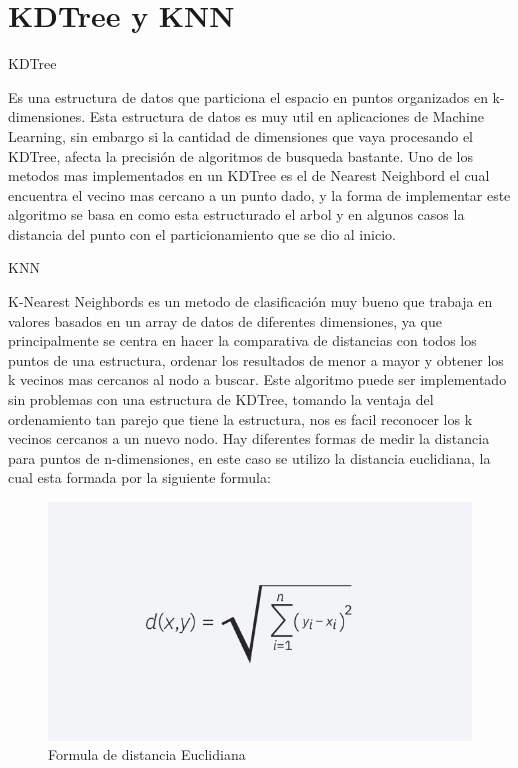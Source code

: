 \documentclass[12pt]{article} %
\begin{document}
\section{KDTree y KNN}
\vspace{10mm}

KDTree
\vspace{10mm}

Es una estructura de datos que particiona el espacio en puntos organizados en k-dimensiones. Esta estructura de datos es muy util en aplicaciones de Machine Learning,
sin embargo si la cantidad de dimensiones que vaya procesando el KDTree, afecta la precisión de algoritmos de busqueda bastante. Uno de los metodos mas implementados en un KDTree
es el de Nearest Neighbord el cual encuentra el vecino mas cercano a un punto dado, y la forma de implementar este algoritmo se basa en como esta estructurado el arbol 
y en algunos casos la distancia del punto con el particionamiento que se dio al inicio.
\vspace{10mm}

KNN
\vspace{10mm}

K-Nearest Neighbords es un metodo de clasificación muy bueno que trabaja en valores basados en un array de datos de diferentes dimensiones, ya que principalmente se centra en 
hacer la comparativa de distancias con todos los puntos de una estructura, ordenar los resultados de menor a mayor y obtener los k vecinos mas cercanos al nodo a buscar.
Este algoritmo puede ser implementado sin problemas con una estructura de KDTree, tomando la ventaja del ordenamiento tan parejo que tiene la estructura, nos es facil reconocer los 
k vecinos cercanos a un nuevo nodo.
Hay diferentes formas de medir la distancia para puntos de n-dimensiones, en este caso se utilizo la distancia euclidiana, la cual esta formada por la siguiente formula:


\begin{figure}[H]
\centering
\includegraphics[width=\textwidth]{euclidiana}
\caption{Formula de distancia Euclidiana}
\end{figure}
\end{document}
